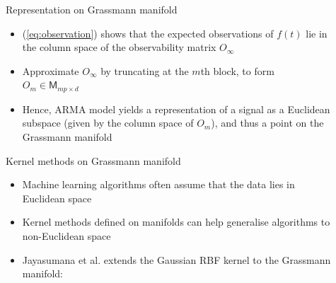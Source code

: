 \documentclass[final]{beamer}
\newlength{\sepwid}
\newlength{\onecolwid}
\begin{document}
\begin{frame}[t]
\begin{columns}[t]
\begin{column}{\onecolwid}

\end{column} %

\begin{column}{\sepwid}\end{column} %

\begin{column}{\onecolwid} %


\begin{block}{Representation on Grassmann manifold}
    \begin{itemize}
        \item (\ref{eq:observation}) shows that the expected observations of $f(t)$ lie in the
            column space of the observability matrix $O_\infty$

        \item Approximate $O_\infty$ by truncating at the $m$th block, to form $O_m \in
            \mathsf{M}_{mp \times d}$

        \item Hence, ARMA model yields a representation of a signal as a Euclidean subspace (given
            by the column space of $O_m$), and thus a point on the Grassmann manifold
    \end{itemize}
\end{block}


\begin{block}{Kernel methods on Grassmann manifold}
    \begin{itemize}
        \item Machine learning algorithms often assume that the data lies in Euclidean space

        \item Kernel methods defined on manifolds can help generalise algorithms to non-Euclidean
            space

        \item Jayasumana et al. \cite{jayasumana_kernel_2015} extends the Gaussian RBF kernel to the
            Grassmann manifold:


\end{itemize}
\end{block}
\end{column}
\end{columns}
\end{frame}
\end{document}
